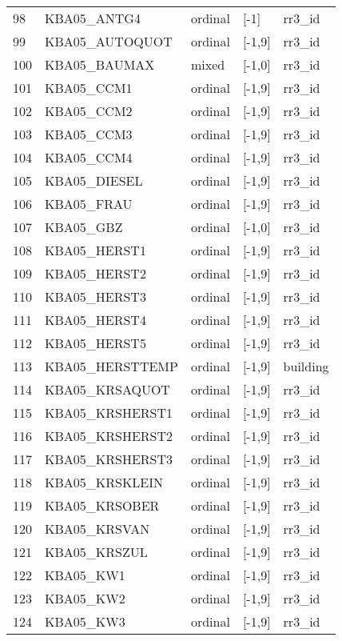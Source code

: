 \begin{longtable}{lllll}
98  &  KBA05\_ANTG4 &  ordinal &   [-1] &    rr3\_id \\
99  &   KBA05\_AUTOQUOT &  ordinal & [-1,9] &    rr3\_id \\
100 &     KBA05\_BAUMAX &    mixed & [-1,0] &    rr3\_id \\
101 &   KBA05\_CCM1 &  ordinal & [-1,9] &    rr3\_id \\
102 &   KBA05\_CCM2 &  ordinal & [-1,9] &    rr3\_id \\
103 &   KBA05\_CCM3 &  ordinal & [-1,9] &    rr3\_id \\
104 &   KBA05\_CCM4 &  ordinal & [-1,9] &    rr3\_id \\
105 &     KBA05\_DIESEL &  ordinal & [-1,9] &    rr3\_id \\
106 &   KBA05\_FRAU &  ordinal & [-1,9] &    rr3\_id \\
107 & KBA05\_GBZ &  ordinal & [-1,0] &    rr3\_id \\
108 &     KBA05\_HERST1 &  ordinal & [-1,9] &    rr3\_id \\
109 &     KBA05\_HERST2 &  ordinal & [-1,9] &    rr3\_id \\
110 &     KBA05\_HERST3 &  ordinal & [-1,9] &    rr3\_id \\
111 &     KBA05\_HERST4 &  ordinal & [-1,9] &    rr3\_id \\
112 &     KBA05\_HERST5 &  ordinal & [-1,9] &    rr3\_id \\
113 &  KBA05\_HERSTTEMP &  ordinal & [-1,9] &  building \\
114 &   KBA05\_KRSAQUOT &  ordinal & [-1,9] &    rr3\_id \\
115 &  KBA05\_KRSHERST1 &  ordinal & [-1,9] &    rr3\_id \\
116 &  KBA05\_KRSHERST2 &  ordinal & [-1,9] &    rr3\_id \\
117 &  KBA05\_KRSHERST3 &  ordinal & [-1,9] &    rr3\_id \\
118 &   KBA05\_KRSKLEIN &  ordinal & [-1,9] &    rr3\_id \\
119 &    KBA05\_KRSOBER &  ordinal & [-1,9] &    rr3\_id \\
120 &     KBA05\_KRSVAN &  ordinal & [-1,9] &    rr3\_id \\
121 &     KBA05\_KRSZUL &  ordinal & [-1,9] &    rr3\_id \\
122 & KBA05\_KW1 &  ordinal & [-1,9] &    rr3\_id \\
123 & KBA05\_KW2 &  ordinal & [-1,9] &    rr3\_id \\
124 & KBA05\_KW3 &  ordinal & [-1,9] &    rr3\_id \\

\end{longtable}
